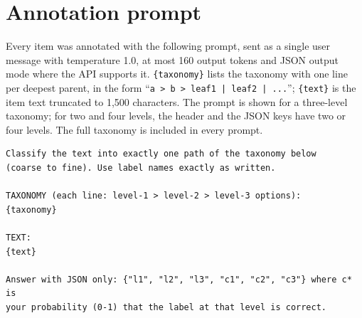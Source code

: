 \documentclass[11pt]{article}
\begin{document}
\section*{Annotation prompt}

Every item was annotated with the following prompt, sent as a single user
message with temperature 1.0, at most 160 output tokens and JSON output mode
where the API supports it. \texttt{\{taxonomy\}} lists the taxonomy with one line per deepest parent, in
the form ``\texttt{a > b > leaf1 | leaf2 | ...}''; \texttt{\{text\}} is the item
text truncated to 1,500 characters. The prompt is shown for a three-level
taxonomy; for two and four levels, the header and the JSON keys have two or four
levels. The full taxonomy is included in every prompt.

\begin{footnotesize}
\begin{verbatim}
Classify the text into exactly one path of the taxonomy below
(coarse to fine). Use label names exactly as written.

TAXONOMY (each line: level-1 > level-2 > level-3 options):
{taxonomy}

TEXT:
{text}

Answer with JSON only: {"l1", "l2", "l3", "c1", "c2", "c3"} where c* is
your probability (0-1) that the label at that level is correct.
\end{verbatim}
\end{footnotesize}
\end{document}
